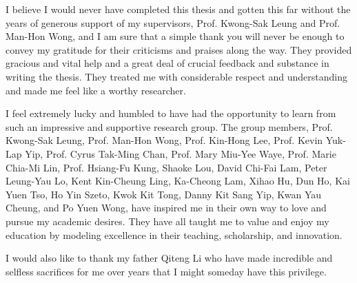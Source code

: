 I believe I would never have completed this thesis and gotten this far without the years of generous support of my supervisors, Prof. Kwong-Sak Leung and Prof. Man-Hon Wong, and I am sure that a simple thank you will never be enough to convey my gratitude for their criticisms and praises along the way. They provided gracious and vital help and a great deal of crucial feedback and substance in writing the thesis. They treated me with considerable respect and understanding and made me feel like a worthy researcher.

I feel extremely lucky and humbled to have had the opportunity to learn from such an impressive and supportive research group. The group members, Prof. Kwong-Sak Leung, Prof. Man-Hon Wong, Prof. Kin-Hong Lee, Prof. Kevin Yuk-Lap Yip, Prof. Cyrus Tak-Ming Chan, Prof. Mary Miu-Yee Waye, Prof. Marie Chia-Mi Lin, Prof. Hsiang-Fu Kung, Shaoke Lou, David Chi-Fai Lam, Peter Leung-Yau Lo, Kent Kin-Cheung Ling, Ka-Cheong Lam, Xihao Hu, Dun Ho, Kai Yuen Tso, Ho Yin Szeto, Kwok Kit Tong, Danny Kit Sang Yip, Kwan Yau Cheung, and Po Yuen Wong, have inspired me in their own way to love and pursue my academic desires. They have all taught me to value and enjoy my education by modeling excellence in their teaching, scholarship, and innovation.

I would also like to thank my father Qiteng Li who have made incredible and selfless sacrifices for me over years that I might someday have this privilege.
